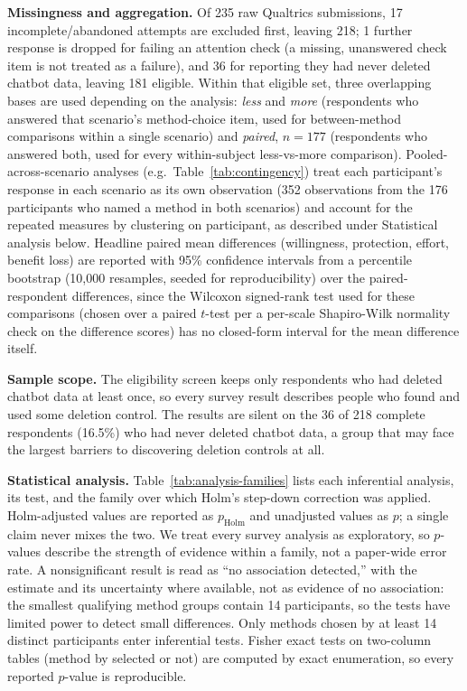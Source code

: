 \documentclass[conference,compsoc]{IEEEtran}
\begin{document}
\textbf{Missingness and aggregation.} Of 235 raw Qualtrics submissions,
17 incomplete/abandoned attempts are excluded first, leaving 218; 1
further response is dropped for failing an attention check (a missing,
unanswered check item is not treated as a failure), and 36 for reporting
they had never deleted chatbot data, leaving 181 eligible.
Within that eligible set, three overlapping bases are used depending on
the analysis: \textit{less} and \textit{more} (respondents who answered
that scenario's method-choice item, used for between-method comparisons
within a single scenario) and \textit{paired}, $n=177$ (respondents who
answered both, used for every within-subject less-vs-more comparison).
Pooled-across-scenario analyses (e.g.\ Table~\ref{tab:contingency}) treat
each participant's response in each scenario as its own observation (352
observations from the 176 participants who named a method in both
scenarios) and account for the repeated measures by clustering on
participant, as described under Statistical analysis below. Headline paired mean differences
(willingness, protection, effort, benefit loss) are reported with 95\%
confidence intervals from a percentile bootstrap (10,000 resamples,
seeded for reproducibility) over the paired-respondent differences, since
the Wilcoxon signed-rank test used for these comparisons (chosen over a
paired $t$-test per a per-scale Shapiro-Wilk normality check on the
difference scores) has no closed-form interval for the mean difference
itself.

\textbf{Sample scope.} The eligibility screen keeps only respondents who
had deleted chatbot data at least once, so every survey result describes
people who found and used some deletion control. The results are silent on
the 36 of 218 complete respondents (16.5\%) who had never deleted chatbot
data, a group that may face the largest barriers to discovering deletion
controls at all.

\textbf{Statistical analysis.} Table~\ref{tab:analysis-families} lists each
inferential analysis, its test, and the family over which Holm's step-down
correction was applied. Holm-adjusted values are reported as
$p_{\mathrm{Holm}}$ and unadjusted values as $p$; a single claim never
mixes the two. We treat every survey analysis as exploratory, so $p$-values
describe the strength of evidence within a family, not a paper-wide error
rate. A nonsignificant result is read as ``no association detected,'' with
the estimate and its uncertainty where available, not as evidence of no
association: the smallest qualifying method groups contain 14 participants,
so the tests have limited power to detect small differences. Only methods
chosen by at least 14 distinct participants enter inferential tests. Fisher
exact tests on two-column tables (method by selected or not) are computed by
exact enumeration, so every reported $p$-value is reproducible.
\end{document}
